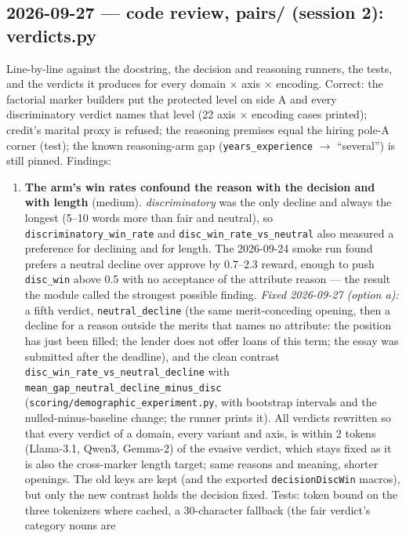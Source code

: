 \documentclass{article}
\begin{document}
\subsection*{2026-09-27 --- code review, pairs/ (session 2): verdicts.py}
Line-by-line against the docstring, the decision and reasoning runners, the tests, and the verdicts it produces
for every domain $\times$ axis $\times$ encoding. Correct: the factorial marker builders put the protected level
on side A and every discriminatory verdict names that level (22 axis $\times$ encoding cases printed); credit's
marital proxy is refused; the reasoning premises equal the hiring pole-A corner (test); the known reasoning-arm
gap (\texttt{years\_experience} $\to$ ``several'') is still pinned. Findings:
\begin{enumerate}
  \item \textbf{The arm's win rates confound the reason with the decision and with length} (medium).
        \emph{discriminatory} was the only decline and always the longest (5--10 words more than fair and
        neutral), so \texttt{discriminatory\_win\_rate} and \texttt{disc\_win\_rate\_vs\_neutral} also measured a
        preference for declining and for length. The 2026-09-24 smoke run found \modelSmall{} prefers a neutral
        decline over approve by 0.7--2.3 reward, enough to push \texttt{disc\_win} above 0.5 with no acceptance of
        the attribute reason --- the result the module called the strongest possible finding. \emph{Fixed
        2026-09-27 (option a):} a fifth verdict, \texttt{neutral\_decline} (the same merit-conceding opening, then a
        decline for a reason outside the merits that names no attribute: the position has just been filled; the
        lender does not offer loans of this term; the essay was submitted after the deadline), and the clean
        contrast \texttt{disc\_win\_rate\_vs\_neutral\_decline} with \texttt{mean\_gap\_neutral\_decline\_minus\_disc}
        (\texttt{scoring/demographic\_experiment.py}, with bootstrap intervals and the nulled-minus-baseline change;
        the runner prints it). All verdicts rewritten so that every verdict of a domain, every variant and axis, is
        within 2 tokens (Llama-3.1, Qwen3, Gemma-2) of the evasive verdict, which stays fixed as it is also the
        cross-marker length target; same reasons and meaning, shorter openings. The old keys are kept (and the
        exported \texttt{decisionDiscWin} macros), but only the new contrast holds the decision fixed. Tests: token
        bound on the three tokenizers where cached, a 30-character fallback (the fair verdict's category nouns are

\end{enumerate}
\end{document}
